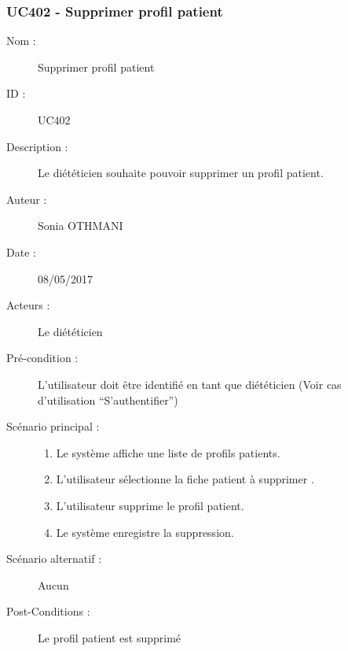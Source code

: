 \subsubsection{UC402 - Supprimer profil patient}
\begin{description}
\item [Nom :] Supprimer profil patient
\item [ID :] UC402
\item [Description :] Le diététicien souhaite pouvoir supprimer un profil patient.
\item [Auteur :] Sonia OTHMANI
\item [Date :] 08/05/2017
\item [Acteurs :] Le diététicien
\item [Pré-condition :] L’utilisateur doit être identifié en tant que diététicien (Voir cas d’utilisation \enquote{S’authentifier})
\item [Scénario principal :]
  \begin{enumerate}
  \item Le système affiche une liste de profils patients.
  \item L’utilisateur sélectionne la fiche patient à supprimer .
  \item L’utilisateur supprime le profil patient.
  \item Le système enregistre la suppression.
  \end{enumerate}
\item [Scénario alternatif :] Aucun
\item [Post-Conditions :] Le profil patient est supprimé
\end{description}
